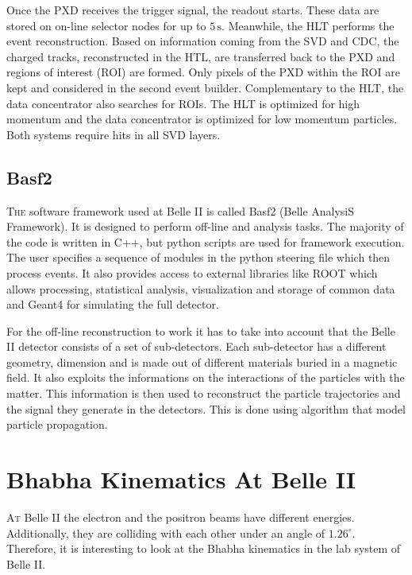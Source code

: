\documentclass[a4paper,11pt,twosided,final,german,openbib,pdftex,listof=totoc,bibliography=totoc]{scrbook}
\begin{document}
Once the PXD receives the trigger signal, the readout starts. These data are stored on on-line selector nodes for up to $5\,\textrm{s}$. Meanwhile, the HLT performs the event reconstruction. Based on information coming from the SVD and CDC, the charged tracks, reconstructed in the HTL, are transferred back to the PXD and regions of interest (ROI) are formed. Only pixels of the PXD within the ROI are kept and considered in the second event builder. Complementary to the HLT, the data concentrator also searches for ROIs. The HLT is optimized for high momentum and the data concentrator is optimized for low momentum particles. Both systems require hits in all SVD layers. \cite{B2TR}


\section{Basf2}
\label{sec:Tools}

\lettrine{T}{he} software framework used at Belle II is called Basf2 (Belle AnalysiS Framework). It is designed to perform off-line and analysis tasks. The majority of the code is written in C++, but python scripts are used for framework execution. The user specifies a sequence of modules in the python steering file which then process events. It also provides access to external libraries like ROOT which allows processing, statistical analysis, visualization and storage of common data and Geant4 for simulating the full detector.\cite{Moll_2011}


For the off-line reconstruction to work it has to take into account that the Belle II detector consists of a set of sub-detectors. Each sub-detector has a different geometry, dimension and is made out of different materials buried in a magnetic field. It also exploits the informations on the interactions of the particles with the matter. This information is then used to reconstruct the particle trajectories and the signal they generate in the detectors. This is done using algorithm that model particle propagation.






\chapter{Bhabha Kinematics At Belle II}
\label{cha:Kinematics}

\lettrine{A}{t} Belle II the electron and the positron beams have different energies. Additionally, they are colliding with each other under an angle of $1.26^{\circ}$. Therefore, it is interesting to look at the Bhabha kinematics in the lab system of Belle II.
\end{document}
